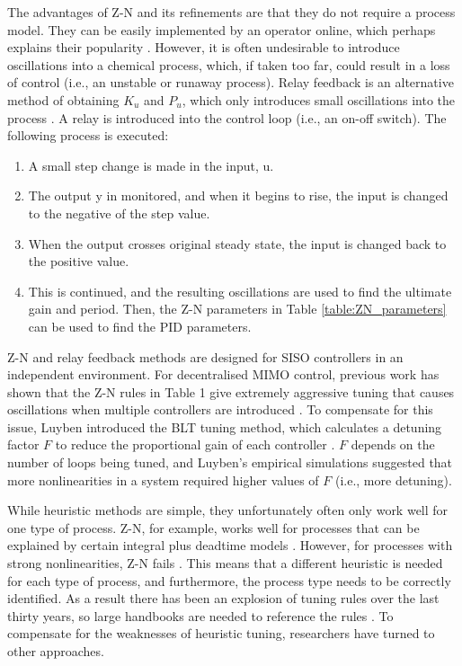 The advantages of Z-N and its refinements\cite{Hang1991} are that they do not require a process model. They can be easily implemented by an operator online, which perhaps explains their popularity \cite{KiamHeongAng2005}. However, it is often undesirable to introduce oscillations into a chemical process, which, if taken too far, could result in a loss of control (i.e., an unstable or runaway process). Relay feedback is an alternative method of obtaining $K_u$ and $P_u$, which only introduces small oscillations into the process \cite{Shen1994}. A relay is introduced into the control loop (i.e., an on-off switch).  The following process is executed: 
\begin{enumerate}
    \item A small step change is made in the input, u.
    \item The output y in monitored, and when it begins to rise, the input is changed to the negative of the step value.
    \item When the output crosses original steady state, the input is changed back to the positive value.
    \item 	This is continued, and the resulting oscillations are used to find the ultimate gain and period. Then, the Z-N parameters in Table \ref{table:ZN_parameters} can be used to find the PID parameters. 
\end{enumerate}


Z-N and relay feedback methods are designed for SISO controllers in an independent environment. For decentralised MIMO control, previous work has shown that the Z-N rules in Table 1 give extremely aggressive tuning that causes oscillations when multiple controllers are introduced \cite{Riggs2006}. To compensate for this issue, Luyben introduced the BLT tuning method, which calculates a detuning factor $F$ to reduce the proportional gain of each controller \cite{Luyben1986}. $F$ depends on the number of loops being tuned, and Luyben's empirical simulations suggested that more nonlinearities in a system required higher values of $F$ (i.e., more detuning).

While heuristic methods are simple, they unfortunately often only work well for one type of process. Z-N, for example, works well for processes that can be explained by certain integral plus deadtime models \cite{ODwyer2009}. However, for processes with strong nonlinearities, Z-N fails \cite{Hang1991}. This means that a different heuristic is needed for each type of process, and furthermore, the process type needs to be correctly identified. As a result there has been an explosion of tuning rules over the last thirty years, so large handbooks are needed to reference the rules \cite{ODwyer2009}. To compensate for the weaknesses of heuristic tuning, researchers have turned to other approaches.
 
